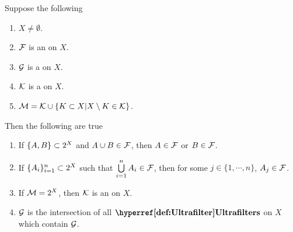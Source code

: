\begin{prop}
\label{prop:UltrafilterFacts}
    Suppose the following
    \begin{enumerate}[label=(\Roman*), ref={\ref{prop:UltrafilterFacts}.~\Roman*}]
        \item \label{prop:UltrafilterFacts:Ass1} $X \neq \emptyset$. 
        \item \label{prop:UltrafilterFacts:Ass2} $\mathcal{F}$ is an \Ultrafilter on $X$. 
        \item \label{prop:UltrafilterFacts:Ass3} $\mathcal{G}$ is a \Filter on $X$. 
        \item \label{prop:UltrafilterFacts:Ass4} $\mathcal{K}$ is a \FilterSubbasis on $X$. 
        \item \label{prop:UltrafilterFacts:Ass5} 
        $\mathcal{M}=\mathcal{K} \cup \{K \subset X | X \setminus K \in \mathcal{K}\}$. 
    \end{enumerate}

    Then the following are true
    \begin{enumerate}[label=(\roman*), ref={\ref{prop:UltrafilterFacts}.~\roman*}]
        \item \label{prop:UltrafilterFacts:BinaryUnion} 
        If $\{A,B\} \subset 2^{X}$ and 
        $A \cup B \in \mathcal{F}$, 
        then  $A \in \mathcal{F}$ or $B \in \mathcal{F}$. 
        \item \label{prop:UltrafilterFacts:FiniteUnion}
        If $\{A_i\}_{i=1}^n \subset 2^{X}$ such that 
        $\bigcup\limits_{i=1}^n A_i \in \mathcal{F}$, 
        then for some $j \in \{1, \cdots, n\}$, 
        $A_j \in \mathcal{F}$. 
        \item \label{prop:UltraFilterFacts:UltrafilterCondition}
        If $\mathcal{M} = 2^{X}$, then $\mathcal{K}$ is an \UltraFilter on $X$. 
        \item \label{prop:UltraFilterFacts:UltrafilterIntersection} 
        $\mathcal{G}$ is the intersection of all $\Ultrafilters$ on $X$ which contain $\mathcal{G}$.
    \end{enumerate}



\end{prop}
